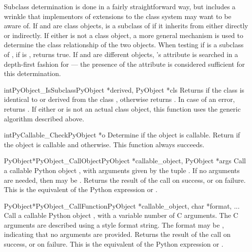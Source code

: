 \documentclass{manual}
\begin{document}
Subclass determination is done in a fairly straightforward way, but
includes a wrinkle that implementors of extensions to the class system
may want to be aware of.  If  and  are class
objects,  is a subclass of  if it inherits from
 either directly or indirectly.  If either is not a class
object, a more general mechanism is used to determine the class
relationship of the two objects.  When testing if  is a
subclass of , if  is ,
 returns true.  If  and
 are different objects, 's  attribute
is searched in a depth-first fashion for  --- the presence of
the  attribute is considered sufficient for this
determination.

\begin{cfuncdesc}{int}{PyObject_IsSubclass}{PyObject *derived,
                                            PyObject *cls}
Returns  if the class  is identical to or derived
from the class , otherwise returns .  In case of an
error, returns .  If either  or  is not
an actual class object, this function uses the generic algorithm
described above.
\end{cfuncdesc}


\begin{cfuncdesc}{int}{PyCallable_Check}{PyObject *o}
Determine if the object  is callable.  Return  if the
object is callable and  otherwise.
This function always succeeds.
\end{cfuncdesc}


\begin{cfuncdesc}{PyObject*}{PyObject_CallObject}{PyObject *callable_object,
                                                  PyObject *args}
Call a callable Python object , with
arguments given by the tuple .  If no arguments are
needed, then  may be \NULL{}.  Returns the result of the
call on success, or \NULL{} on failure.  This is the equivalent
of the Python expression  or .
\end{cfuncdesc}

\begin{cfuncdesc}{PyObject*}{PyObject_CallFunction}{PyObject *callable_object,
                                                    char *format, ...}
Call a callable Python object , with a
variable number of C arguments. The C arguments are described
using a  style format string. The format may
be \NULL{}, indicating that no arguments are provided.  Returns the
result of the call on success, or \NULL{} on failure.  This is
the equivalent of the Python expression
 or
.
\end{cfuncdesc}
\end{document}

